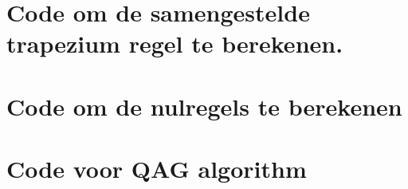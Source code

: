 \documentclass{article}
\begin{document}
\pagebreak
\begin{appendices}
\section{Code om de samengestelde trapezium regel te berekenen.} \label{s:ctrap}

\pagebreak
\section{Code om de nulregels te berekenen} \label{s:nm}

\pagebreak
\section{Code voor QAG algorithm} \label{s:qag}

\end{appendices}
\end{document}
